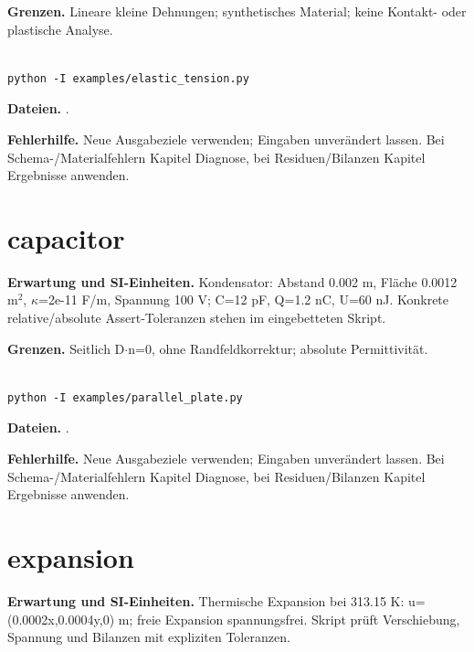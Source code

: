 \textbf{Grenzen.} Lineare kleine Dehnungen; synthetisches Material; keine Kontakt- oder plastische Analyse.

\begin{lstlisting}

python -I examples/elastic_tension.py

\end{lstlisting}

\textbf{Dateien.} .

\textbf{Fehlerhilfe.} Neue Ausgabeziele verwenden; Eingaben unverändert lassen. Bei Schema-/Materialfehlern Kapitel Diagnose, bei Residuen/Bilanzen Kapitel Ergebnisse anwenden.



\section{capacitor}\label{recipe:capacitor}

\textbf{Erwartung und SI-Einheiten.} Kondensator: Abstand 0.002 m, Fläche 0.0012 m$^2$, $\kappa$=2e-11 F/m, Spannung 100 V; C=12 pF, Q=1.2 nC, U=60 nJ. Konkrete relative/absolute Assert-Toleranzen stehen im eingebetteten Skript.

\textbf{Grenzen.} Seitlich D$\cdot$n=0, ohne Randfeldkorrektur; absolute Permittivität.

\begin{lstlisting}

python -I examples/parallel_plate.py

\end{lstlisting}

\textbf{Dateien.} .

\textbf{Fehlerhilfe.} Neue Ausgabeziele verwenden; Eingaben unverändert lassen. Bei Schema-/Materialfehlern Kapitel Diagnose, bei Residuen/Bilanzen Kapitel Ergebnisse anwenden.



\section{expansion}\label{recipe:expansion}

\textbf{Erwartung und SI-Einheiten.} Thermische Expansion bei 313.15 K: u=(0.0002x,0.0004y,0) m; freie Expansion spannungsfrei. Skript prüft Verschiebung, Spannung und Bilanzen mit expliziten Toleranzen.

